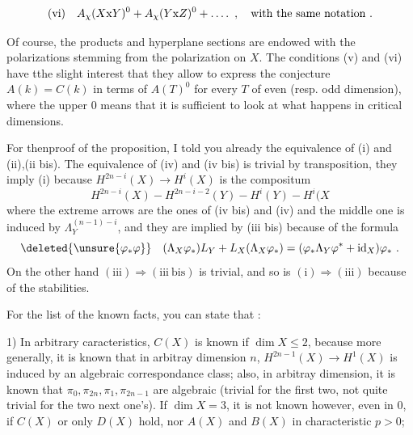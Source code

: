 
\[
\text{(vi)}\quad A_{\chi}(X\mathrm{x}Y)^0+A_{\chi}(Y\mathrm{x}Z)^0+\mathinner{\ldotp\ldotp\ldotp\ldotp}\ ,\quad\text{with the same notation .}
\]

Of course, the products and hyperplane sections are endowed with the polarizations stemming from the polarization on $X$. The conditions (v) and (vi) have tthe slight interest that they allow to express the conjecture $A(k)=C(k)$ in terms of $A(T)^0$ for every $T$ of even (resp. odd dimension), where the upper $0$ means that it is sufficient to look at what happens in critical dimensions.

For thenproof of the proposition, I told you already the equivalence of (i) and (ii),(ii bis). The equivalence of (iv) and (iv bis) is trivial by transposition, they  imply (i) because $H^{2n-i}(X)\to H^i(X)$ is the compositum
\[
H^{2n-i}(X)\mathbin{-}H^{2n-i-2}(Y)\mathbin{-}H^i(Y)\mathbin{-}H^i(X
\]
where the extreme arrows are the ones of (iv bis) and (iv) and the middle one is induced by $\Lambda_Y^{(n-1)-i}$, and they are implied by (iii bis) because of the formula
\[
\deleted{\unsure{\varphi_*\varphi}}\quad(\Lambda_X\varphi_*)L_Y+L_X(\Lambda_X\varphi_*)=(\varphi_*\Lambda_Y\varphi^*+\operatorname{id}_X)\varphi_*\ .
\]
On the other hand $(\mathrm{iii})\Rightarrow(\mathrm{iii\ bis})$ is trivial, and so is $(\mathrm{i})\Longrightarrow(\mathrm{iii})$ because of the stabilities.

For the list of the known facts, you can state that :

1) In arbitrary caracteristics, $C(X)$ is known if $\dim X\leq2$, because more generally, it is known that in arbitray dimension $n$, $H^{2n-1}(X)\to H^1(X)$ is induced by an algebraic correspondance class; also, in arbitray dimension, it is known that $\pi_0,\pi_{2n},\pi_1,\pi_{2n-1}$ are algebraic (trivial for the first two, not quite trivial for the two next one's). If $\dim X=3$, it is not known however, even in  $0$, if $C(X)$ or only $D(X)$ hold, nor $A(X)$ and $B(X)$ in characteristic $p>0$;

